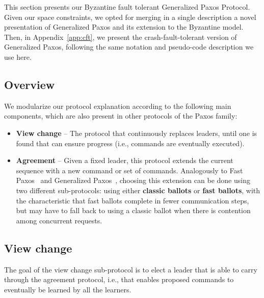 This section presents our Byzantine fault tolerant Generalized Paxos
Protocol. Given our space constraints, we opted for merging in a
single description a novel presentation of Generalized Paxos and its
extension to the Byzantine model. Then, in Appendix~\ref{app:cft}, we
present the crash-fault-tolerant version of Generalized Paxos,
following the same notation and pseudo-code description we use here.

\subsection{Overview}

We modularize our protocol explanation according to the following main components, which are also present in other protocols of the Paxos family:

\begin{itemize}

\item
{\bf View change} -- The protocol that continuously replaces leaders, until one is found that can ensure progress (i.e., commands are eventually executed).

\item
{\bf Agreement} -- Given a fixed leader, this protocol extends the current sequence with a new command or set of commands. Analogously to Fast Paxos~\cite{L06} and Generalized Paxos~\cite{Lamport2005}, choosing this extension can be done using two different sub-protocols: using either {\bf classic ballots} or {\bf fast ballots}, with the characteristic that fast ballots complete in fewer communication steps, but may have to fall back to using a classic ballot when there is contention among concurrent requests.

\end{itemize}

\subsection{View change} 

The goal of the view change sub-protocol is to elect a leader that is able to carry through the agreement protocol, i.e., that enables proposed commands to eventually be learned by all the learners.

